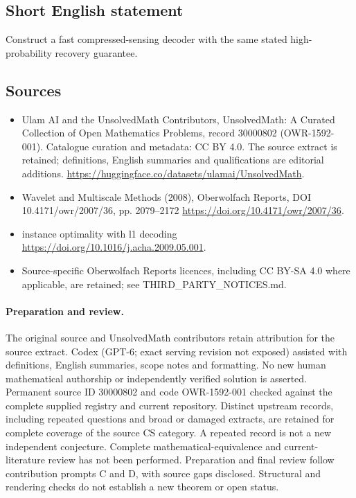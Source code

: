 \documentclass[11pt]{article}
\begin{document}
\subsection{Short English statement}
Construct a fast compressed-sensing decoder with the same stated high-probability recovery guarantee.
\subsection{Sources}
\begin{itemize}
\item[\hypertarget{source:30000802:1}{S1}] Ulam AI and the UnsolvedMath Contributors, UnsolvedMath: A Curated Collection of Open Mathematics Problems, record 30000802 (OWR-1592-001). Catalogue curation and metadata: CC BY 4.0. The source extract is retained; definitions, English summaries and qualifications are editorial additions.
\url{https://huggingface.co/datasets/ulamai/UnsolvedMath}.
\item[\hypertarget{source:30000802:2}{S2}] Wavelet and Multiscale Methods (2008), Oberwolfach Reports, DOI 10.4171/owr/2007/36, pp. 2079--2172
\url{https://doi.org/10.4171/owr/2007/36}.
\item[\hypertarget{source:30000802:3}{S3}] instance optimality with l1 decoding
\url{https://doi.org/10.1016/j.acha.2009.05.001}.
\item Source-specific Oberwolfach Reports licences, including CC BY-SA 4.0 where applicable, are retained; see THIRD\_PARTY\_NOTICES.md.
\end{itemize}
\paragraph{Preparation and review.}
The original source and UnsolvedMath contributors retain attribution for the source extract. Codex (GPT-6; exact serving revision not exposed) assisted with definitions, English summaries, scope notes and formatting. No new human mathematical authorship or independently verified solution is asserted. Permanent source ID 30000802 and code OWR-1592-001 checked against the complete supplied registry and current repository. Distinct upstream records, including repeated questions and broad or damaged extracts, are retained for complete coverage of the source CS category. A repeated record is not a new independent conjecture. Complete mathematical-equivalence and current-literature review has not been performed. Preparation and final review follow contribution prompts C and D, with source gaps disclosed. Structural and rendering checks do not establish a new theorem or open status.
\label{end:30000802}
\end{document}
